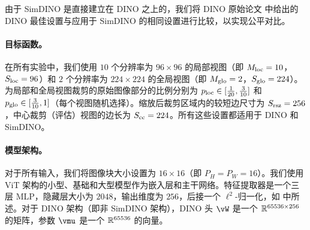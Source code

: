\documentclass[../../book-main.tex]{subfiles}
\begin{document}
由于 SimDINO 是直接建立在 DINO 之上的，我们将 DINO 原始论文 \citep{caron2021emerging} 中给出的 DINO 最佳设置与应用于 SimDINO 的相同设置进行比较，以实现公平对比。

\paragraph{目标函数。} 在所有实验中，我们使用 \(10\) 个分辨率为 \(96 \times 96\) 的局部视图（即 \(M_{\mathrm{loc}} = 10\)，\(S_{\mathrm{loc}} = 96\)）和 \(2\) 个分辨率为 \(224 \times 224\) 的全局视图（即 \(M_{\mathrm{glo}} = 2\)，\(S_{\mathrm{glo}} = 224\)）。为局部和全局视图裁剪的原始图像部分的比例分别为 \(p_{\mathrm{loc}} \in [\frac{1}{20}, \frac{3}{10}]\) 和 \(p_{\mathrm{glo}} \in [\frac{3}{10}, 1]\)（每个视图随机选择）。缩放后裁剪区域内的较短边尺寸为 \(S_{\mathrm{rsz}} = 256\)，中心裁剪（评估）视图的边长为 \(S_{\mathrm{cc}} = 224\)。所有这些设置都适用于 DINO 和 SimDINO。

\paragraph{模型架构。} 对于所有输入，我们将图像块大小设置为 \(16 \times 16\)（即 \(P_{H} = P_{W} = 16\)）。我们使用 ViT \citep{dosovitskiy2020image} 架构的小型、基础和大型模型作为嵌入层和主干网络。特征提取器是一个三层 MLP，隐藏层大小为 \(2048\)，输出维度为 \(256\)，后接一个 \(\ell^{2}\)-归一化，如  中所述。对于 DINO 架构（即非 SimDINO 架构），DINO 头 \(\vW\) 是一个 \(\mathbb{R}^{65536 \times 256}\) 的矩阵，参数 \(\vmu\) 是一个 \(\mathbb{R}^{65536}\) 的向量。
\end{document}
